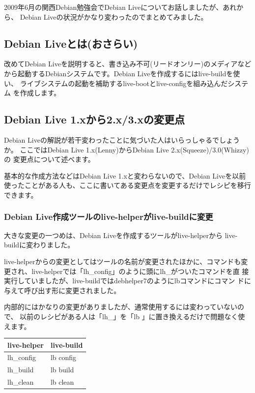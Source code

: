 \documentclass[mingoth,a4paper]{jsarticle}
\begin{document}


2009年6月の関西Debian勉強会でDebian Liveについてお話しましたが、あれから、
Debian Liveの状況がかなり変わったのでまとめてみました。


\subsection{Debian Liveとは(おさらい)}

改めてDebian Liveを説明すると、書き込み不可(リードオンリー)のメディアなど
から起動するDebianシステムです。Debian Liveを作成するにはlive-buildを使い、
ライブシステムの起動を補助するlive-bootとlive-configを組み込んだシステム
を作成します。

\subsection{Debian Live 1.xから2.x/3.xの変更点}

Debian Liveの解説が若干変わったことに気づいた人はいらっしゃるでしょうか。
ここではDebian Live 1.x(Lenny)からDebian Live 2.x(Squeeze)/3.0(Whizzy)の
変更点について述べます。

基本的な作成方法などはDebian Live 1.xと変わらないので、Debian Liveを以前
使ったことがある人も、ここに書いてある変更点を変更するだけでレシピを移行
できます。


\subsubsection{Debian Live作成ツールのlive-helperがlive-buildに変更}

大きな変更の一つめは、Debian Liveを作成するツールがlive-helperから
live-buildに変わりました。

live-helperからの変更としてはツールの名前が変更されたほかに、コマンドも変
更され、live-helperでは「lh\_config」のように頭にlh\_がついたコマンドを直
接実行していましたが、live-buildではdebhelper7のようにlbコマンドにコマン
ドに与えて呼び出す形に変更されました。

内部的にはかなりの変更がありましたが、通常使用するには変わっていないので、
以前のレシピがある人は「lh\_」を「lb 」に置き換えるだけで問題なく使えます。

\begin{table}[h]
\begin{center}
 \begin{tabular}{|l|l|}
 \hline
 live-helper & live-build \\
 \hline \hline
 lh\_config & lb config \\
 \hline
 lh\_build & lb build \\
 \hline
 lh\_clean & lb clean \\
 \hline
 \end{tabular}
\end{center}
\end{table}
\end{document}

